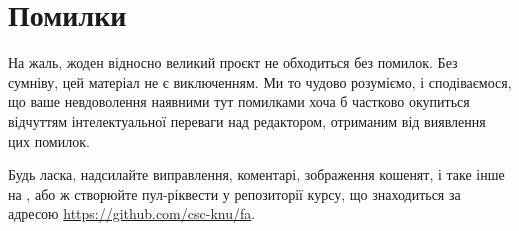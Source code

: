 \section*{Помилки}

На жаль, жоден відносно великий проєкт не обходиться без помилок.
Без сумніву, цей матеріал не є виключенням.  Ми то чудово розуміємо,
і сподіваємося, що ваше невдоволення наявними тут помилками
хоча б частково окупиться відчуттям інтелектуальної переваги над редактором,
отриманим від виявлення цих помилок.

Будь ласка, надсилайте виправлення, коментарі, зображення кошенят,
і таке інше на ,
або ж створюйте пул-ріквести у репозиторії курсу,
що знаходиться за адресою \url{https://github.com/csc-knu/fa}.
